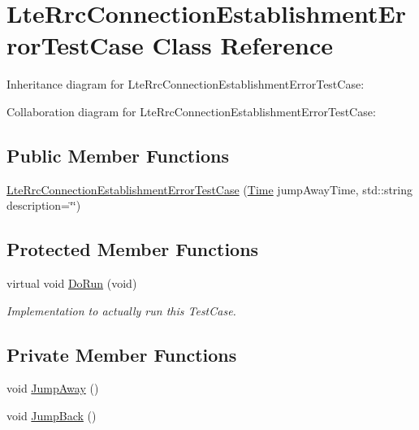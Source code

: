 \hypertarget{classLteRrcConnectionEstablishmentErrorTestCase}{}\section{Lte\+Rrc\+Connection\+Establishment\+Error\+Test\+Case Class Reference}
\label{classLteRrcConnectionEstablishmentErrorTestCase}


Inheritance diagram for Lte\+Rrc\+Connection\+Establishment\+Error\+Test\+Case\+:


Collaboration diagram for Lte\+Rrc\+Connection\+Establishment\+Error\+Test\+Case\+:
\subsection*{Public Member Functions}
\begin{DoxyCompactItemize}
\item 
\hyperlink{classLteRrcConnectionEstablishmentErrorTestCase_ad36b823c052ab341d07c77f27e989251}{Lte\+Rrc\+Connection\+Establishment\+Error\+Test\+Case} (\hyperlink{classns3_1_1Time}{Time} jump\+Away\+Time, std\+::string description=\char`\"{}\char`\"{})
\end{DoxyCompactItemize}
\subsection*{Protected Member Functions}
\begin{DoxyCompactItemize}
\item 
virtual void \hyperlink{classLteRrcConnectionEstablishmentErrorTestCase_adaffd410f878c9af5d8d4df0db31eeee}{Do\+Run} (void)
\begin{DoxyCompactList}\small\item\em Implementation to actually run this Test\+Case. \end{DoxyCompactList}\end{DoxyCompactItemize}
\subsection*{Private Member Functions}
\begin{DoxyCompactItemize}
\item 
void \hyperlink{classLteRrcConnectionEstablishmentErrorTestCase_a297c4a558b44845a12725703d3604ab2}{Jump\+Away} ()
\item 
void \hyperlink{classLteRrcConnectionEstablishmentErrorTestCase_a225bf3ff1808c5f71cac5a85ffbb7fd6}{Jump\+Back} ()
\end{DoxyCompactItemize}
